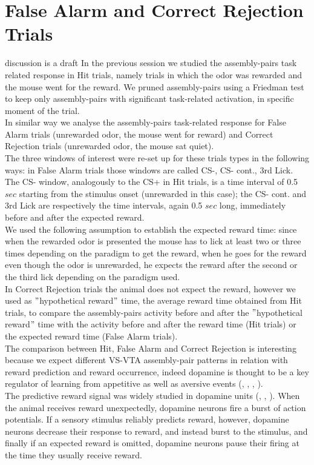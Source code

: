 \section{False Alarm and Correct Rejection Trials}
{\color{red} discussion is a draft}
In the previous session we studied the assembly-pairs task related response in Hit trials, namely trials in which the odor was rewarded and the mouse went for the reward. We pruned assembly-pairs using a Friedman test to keep only assembly-pairs with significant task-related activation, in specific moment of the trial.\\In similar way we analyse the assembly-pairs task-related response for False Alarm trials (unrewarded odor, the mouse went for reward) and Correct Rejection trials (unrewarded odor, the mouse sat quiet).\\The three windows of interest were re-set up for these trials types in the following ways: in False Alarm trials those windows are called CS-, CS- cont., 3rd Lick. The CS- window, analogously to the CS+ in Hit trials, is a time interval of 0.5 $sec$ starting from the stimulus onset (unrewarded in this case); the CS- cont. and 3rd Lick are respectively the time intervals, again 0.5 $sec$ long, immediately before and after the expected reward.\\We used the following assumption to establish the expected reward time: since when the rewarded odor is presented the mouse has to lick at least two or three times depending on the paradigm to get the reward, when he goes for the reward even though the odor is unrewarded, he expects the reward after the second or the third lick depending on the paradigm used.\\In Correct Rejection trials the animal does not expect the reward, however we used as $"$hypothetical reward$"$ time, the average reward time obtained from Hit trials, to compare the assembly-pairs activity before and after the $"$hypothetical reward$"$ time with the activity before and after the reward time (Hit trials) or the expected reward time (False Alarm trials).\\The comparison between Hit, False Alarm and Correct Rejection is interesting because we expect different VS-VTA assembly-pair patterns in relation with reward prediction and reward occurrence, indeed dopamine is thought to be a key regulator of learning from appetitive as well as aversive events (\cite{Schultz1997}, \cite{Wenzel}, \cite{Fiorillo2013}, \cite{Schultz2015}).\\The predictive reward signal was widely studied in dopamine units (\cite{Schultz1998}, \cite{Schultz2001}, \cite{Doya}). When the animal receives reward unexpectedly, dopamine neurons fire a burst of action potentials. If a sensory stimulus reliably predicts reward, however, dopamine neurons decrease their response to reward, and instead burst to the stimulus, and finally if an expected reward is omitted, dopamine neurons pause their firing at the time they usually receive reward.\\
